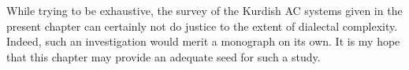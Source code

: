 While trying to be exhaustive, the survey of the Kurdish AC systems given in the present chapter can certainly not do justice to the extent of dialectal complexity. Indeed, such an investigation would merit a monograph on its own. It is my hope that this chapter may provide an adequate seed for such a study. 










